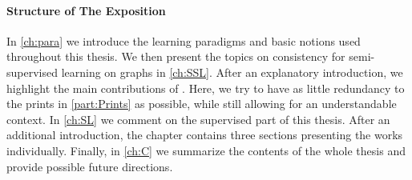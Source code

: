 \paragraph{Structure of The Exposition} In \cref{ch:para} we introduce the learning paradigms and basic notions used throughout this thesis. We then present the topics on consistency for semi-supervised learning on graphs in \cref{ch:SSL}. After an explanatory introduction, we highlight the main contributions of \cite{roith2022continuum,bungert2021uniform}. Here, we try to have as little redundancy to the prints in \cref{part:Prints} as possible, while still allowing for an understandable context. In \cref{ch:SL} we comment on the supervised part of this thesis. After an additional introduction, the chapter contains three sections presenting the works \cite{kabri2023resolution,bungert2021clip,bungert2022bregman} individually. Finally, in \cref{ch:C} we summarize the contents of the whole thesis and provide possible future directions.

